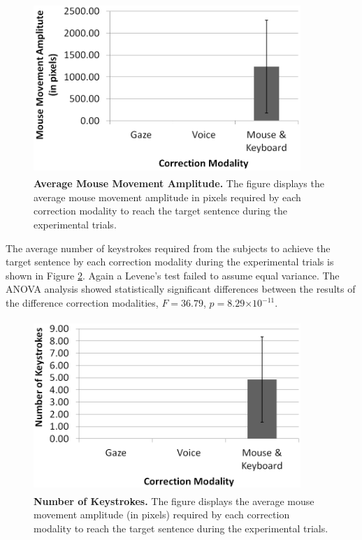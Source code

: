 \documentclass[]{article}
\providecommand{\e}[1]{\ensuremath{\times 10^{#1}}}
\begin{document}
\begin{figure}[ht]
\begin{center}
\vspace{-3mm}
\includegraphics[width=0.9\textwidth,height=65mm]{figures/mouseDisplacement.png}
\end{center}
\caption{\textbf{Average Mouse Movement Amplitude.} The figure displays the average mouse movement amplitude in pixels
required by each correction modality to reach the target sentence during the experimental trials.}
\label{mouseDisplacement}
\end{figure}


The average number of keystrokes required from the subjects to achieve the target sentence by each correction modality
during the experimental trials is shown in Figure \ref{keystrokes}. Again a Levene's test failed to assume equal
variance. The ANOVA analysis showed statistically significant differences between the results of the
difference correction modalities, $F=36.79$, $p=8.29\e{-11}$. 


\begin{figure}[ht]
\begin{center}
\vspace{-3mm}
\includegraphics[width=0.9\textwidth,height=65mm]{figures/keystrokes.png}
\end{center}
\caption{\textbf{Number of Keystrokes.} The figure displays the average mouse movement amplitude (in pixels)
required by each correction modality to reach the target sentence during the experimental trials.}
\label{keystrokes}
\end{figure}
\end{document}

